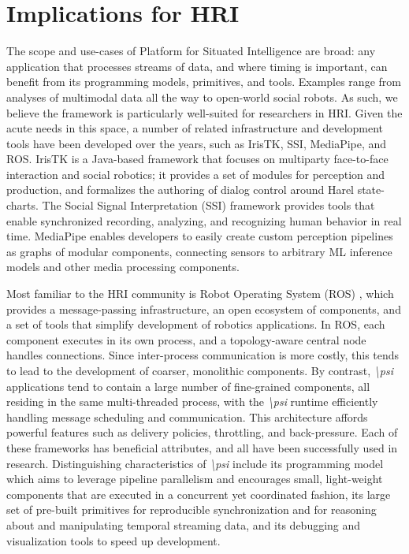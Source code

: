 \documentclass[letterpaper]{article}
\newcommand{\psif}{\emph{\textbackslash psi} }
\begin{document}
\vspace{-3.02mm}
\section{Implications for HRI}

The scope and use-cases of Platform for Situated Intelligence are broad: any application that processes streams of data, and where timing is important, can benefit from its programming models, primitives, and tools. Examples range from analyses of multimodal data all the way to open-world social robots. As such, we believe the framework is particularly well-suited for researchers in HRI.  Given the acute needs in this space, a number of related infrastructure and development tools have been developed over the years, such as IrisTK, SSI, MediaPipe, and ROS. IrisTK \cite{skantze2012iristk} is a Java-based framework that focuses on multiparty face-to-face interaction and social robotics; it provides a set of modules for perception and production, and formalizes the authoring of dialog control around Harel state-charts. The Social Signal Interpretation (SSI) framework \cite{wagner2013social} provides tools that enable synchronized recording, analyzing, and recognizing human behavior in real time. MediaPipe \cite{lugaresi2019mediapipe} enables developers to easily create custom perception pipelines as graphs of modular components, connecting sensors to arbitrary ML inference models and other media processing components.

Most familiar to the HRI community is Robot Operating System (ROS) \cite{Quigley09}, which provides a message-passing infrastructure, an open ecosystem of components, and a set of tools that simplify development of robotics applications. In ROS, each component executes in its own process, and a topology-aware central node handles connections. Since inter-process communication is more costly, this tends to lead to the development of coarser, monolithic components. By contrast, \psif applications tend to contain a large number of fine-grained components, all residing in the same multi-threaded process, with the \psif runtime efficiently handling message scheduling and communication. This architecture affords powerful features such as delivery policies, throttling, and back-pressure.  Each of these frameworks has beneficial attributes, and all have been successfully used in research. Distinguishing characteristics of \psif include its programming model which aims to leverage pipeline parallelism and encourages small, light-weight components that are executed in a concurrent yet coordinated fashion, its large set of pre-built primitives for reproducible synchronization and for reasoning about and manipulating temporal streaming data, and its debugging and visualization tools to speed up development.
\end{document}
